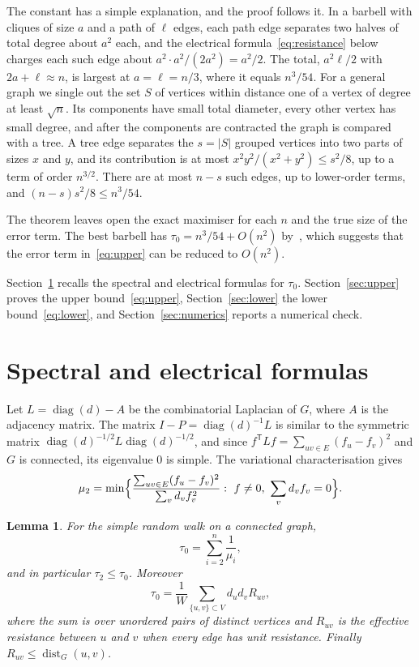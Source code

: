 \documentclass[11pt]{amsart}
\newtheorem{lemma}[theorem]{Lemma}
\theoremstyle{definition}
\theoremstyle{remark}
\numberwithin{equation}{section}
\DeclareMathOperator{\dist}{dist}
\begin{document}
The constant has a simple explanation, and the proof follows it. In a barbell with cliques of size $a$ and a path of $\ell$ edges, each path edge separates two halves of total degree about $a^2$ each, and the electrical formula~\eqref{eq:resistance} below charges each such edge about $a^2\cdot a^2/(2a^2)=a^2/2$. The total, $a^2\ell/2$ with $2a+\ell\approx n$, is largest at $a=\ell=n/3$, where it equals $n^3/54$. For a general graph we single out the set $S$ of vertices within distance one of a vertex of degree at least $\sqrt n$. Its components have small total diameter, every other vertex has small degree, and after the components are contracted the graph is compared with a tree. A tree edge separates the $s=|S|$ grouped vertices into two parts of sizes $x$ and $y$, and its contribution is at most $x^2y^2/(x^2+y^2)\le s^2/8$, up to a term of order $n^{3/2}$. There are at most $n-s$ such edges, up to lower-order terms, and $(n-s)s^2/8\le n^3/54$.

The theorem leaves open the exact maximiser for each $n$ and the true size of the error term. The best barbell has $\tau_0=n^3/54+O(n^2)$ by~\cite{FKK}, which suggests that the error term in~\eqref{eq:upper} can be reduced to $O(n^2)$.

Section~\ref{sec:prelim} recalls the spectral and electrical formulas for $\tau_0$. Section~\ref{sec:upper} proves the upper bound~\eqref{eq:upper}, Section~\ref{sec:lower} the lower bound~\eqref{eq:lower}, and Section~\ref{sec:numerics} reports a numerical check.

\section{Spectral and electrical formulas}\label{sec:prelim}

Let $L=\operatorname{diag}(d)-A$ be the combinatorial Laplacian of $G$, where $A$ is the adjacency matrix. The matrix $I-P=\operatorname{diag}(d)^{-1}L$ is similar to the symmetric matrix $\operatorname{diag}(d)^{-1/2}L\operatorname{diag}(d)^{-1/2}$, and since $f^{\mathsf T}Lf=\sum_{uv\in E}(f_u-f_v)^2$ and $G$ is connected, its eigenvalue $0$ is simple. The variational characterisation gives
\begin{equation}\label{eq:rayleigh}
\mu_2=\min\Bigl\{\frac{\sum_{uv\in E}(f_u-f_v)^2}{\sum_v d_vf_v^2}:\ f\ne0,\ \sum_v d_vf_v=0\Bigr\}.
\end{equation}

\begin{lemma}\label{lem:formulas}
For the simple random walk on a connected graph,
\begin{equation}\label{eq:eigentime}
\tau_0=\sum_{i=2}^n\frac1{\mu_i},
\end{equation}
and in particular $\tau_2\le\tau_0$. Moreover
\begin{equation}\label{eq:resistance}
\tau_0=\frac1W\sum_{\{u,v\}\subset V}d_ud_vR_{uv},
\end{equation}
where the sum is over unordered pairs of distinct vertices and $R_{uv}$ is the effective resistance between $u$ and $v$ when every edge has unit resistance. Finally $R_{uv}\le\dist_G(u,v)$.
\end{lemma}
\end{document}
